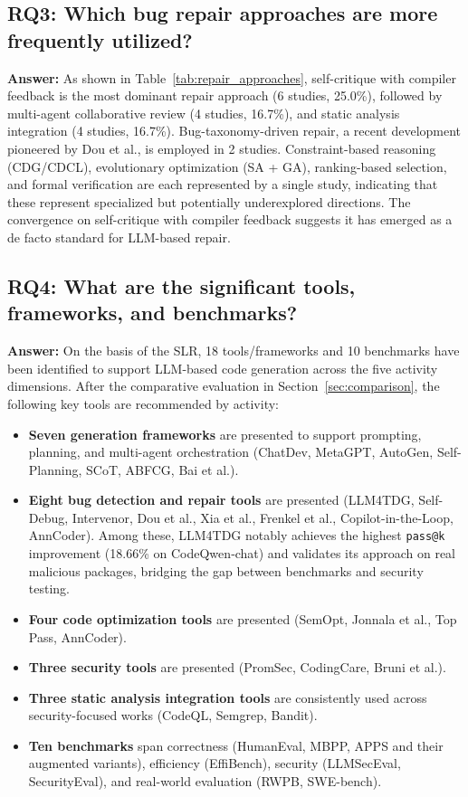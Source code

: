 \documentclass[11pt,a4paper]{article}
\begin{document}
\subsection*{RQ3: Which bug repair approaches are more frequently utilized?}

\textbf{Answer:} As shown in Table~\ref{tab:repair_approaches}, self-critique with compiler feedback is the most dominant repair approach (6 studies, 25.0\%), followed by multi-agent collaborative review (4 studies, 16.7\%), and static analysis integration (4 studies, 16.7\%). Bug-taxonomy-driven repair, a recent development pioneered by Dou et al., is employed in 2 studies. Constraint-based reasoning (CDG/CDCL), evolutionary optimization (SA + GA), ranking-based selection, and formal verification are each represented by a single study, indicating that these represent specialized but potentially underexplored directions. The convergence on self-critique with compiler feedback suggests it has emerged as a de facto standard for LLM-based repair.

\subsection*{RQ4: What are the significant tools, frameworks, and benchmarks?}

\textbf{Answer:} On the basis of the SLR, 18 tools/frameworks and 10 benchmarks have been identified to support LLM-based code generation across the five activity dimensions. After the comparative evaluation in Section~\ref{sec:comparison}, the following key tools are recommended by activity:
\begin{itemize}[leftmargin=*]
\item \textbf{Seven generation frameworks} are presented to support prompting, planning, and multi-agent orchestration (ChatDev, MetaGPT, AutoGen, Self-Planning, SCoT, ABFCG, Bai et al.).
\item \textbf{Eight bug detection and repair tools} are presented (LLM4TDG, Self-Debug, Intervenor, Dou et al., Xia et al., Frenkel et al., Copilot-in-the-Loop, AnnCoder). Among these, LLM4TDG notably achieves the highest \texttt{pass@k} improvement (18.66\% on CodeQwen‑chat) and validates its approach on real malicious packages, bridging the gap between benchmarks and security testing.
\item \textbf{Four code optimization tools} are presented (SemOpt, Jonnala et al., Top Pass, AnnCoder).
\item \textbf{Three security tools} are presented (PromSec, CodingCare, Bruni et al.).
\item \textbf{Three static analysis integration tools} are consistently used across security-focused works (CodeQL, Semgrep, Bandit).
\item \textbf{Ten benchmarks} span correctness (HumanEval, MBPP, APPS and their augmented variants), efficiency (EffiBench), security (LLMSecEval, SecurityEval), and real-world evaluation (RWPB, SWE-bench).
\end{itemize}
\end{document}
